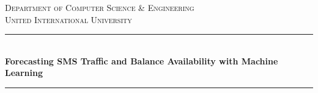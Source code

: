\documentclass[12pt]{book} %
\begin{document}
\begin{titlepage}

\newcommand{\HRule}{\rule{\linewidth}{0.5mm}} %
\center %
 

\textsc{\Large Department of Computer Science \& Engineering}\\[0.5cm] %
\textsc{\Huge United International University}\\[1cm] %


\HRule \\[0.4cm]
{ {\Large \textbf{Forecasting SMS Traffic and Balance Availability with Machine Learning}}}\\
\HRule \\ [1cm]


\end{titlepage}
\end{document}
